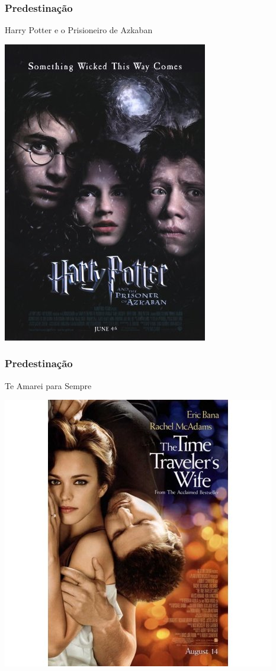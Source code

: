 \begin{frame}
    \frametitle{Predestinação}
    
    \alert{Harry Potter e o Prisioneiro de Azkaban}

    \includegraphics[height=0.8\textheight]{img/posters/hpatpoa.jpg}
\end{frame}

\begin{frame}
    \frametitle{Predestinação}
    
    \alert{Te Amarei para Sempre}

    \includegraphics[height=0.8\textheight]{img/posters/ttw.jpeg}
\end{frame}

